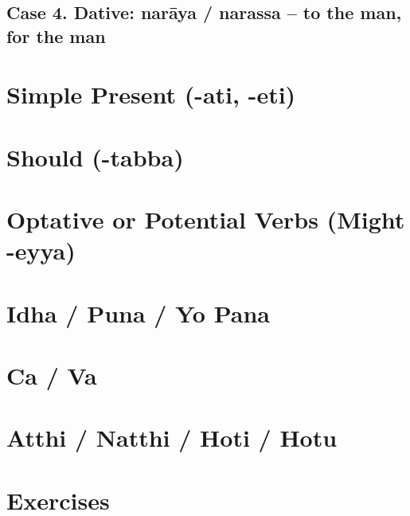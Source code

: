 \documentclass[11pt,oneside]{memoir}
\begin{document}
\subsection{Case 4. Dative: narāya / narassa -- to the man, for the man}
\label{sec:orgc1b069b}

\section{Simple Present (-ati, -eti)}
\label{sec:org8d91fcf}
\section{Should (-tabba)}
\label{sec:orge171455}
\section{Optative or Potential Verbs (Might -eyya)}
\label{sec:orgf479b23}
\section{Idha / Puna / Yo Pana}
\label{sec:orga4db15e}
\section{Ca / Va}
\label{sec:orgcd615b8}
\section{Atthi / Natthi / Hoti / Hotu}
\label{sec:org638d878}
\section{Exercises}
\label{sec:org3a36993}

\renewcommand{\arraystretch}{2}
\end{document}
